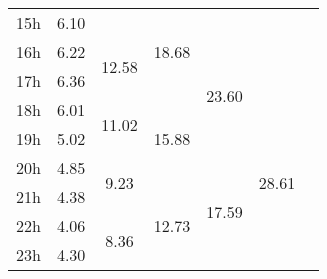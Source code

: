 \begin{center}
\begin{tabular}{| l || c | c | c | c | c | c |}
 15h  &  \multirow{1}{*}{ 6.10 }   &   &  \multirow{3}{*}{ 18.68 }   &   &   &  \\\cline{2-2}\cline{3-3}\cline{5-5} 
 16h  &  \multirow{1}{*}{ 6.22 }   &  \multirow{2}{*}{ 12.58 }   &   &  \multirow{4}{*}{ 23.60 }   &   &  \\\cline{2-2} 
 17h  &  \multirow{1}{*}{ 6.36 }   &   &   &   &   &  \\\cline{2-2}\cline{3-3}\cline{4-4}\cline{6-6} 
 18h  &  \multirow{1}{*}{ 6.01 }   &  \multirow{2}{*}{ 11.02 }   &  \multirow{3}{*}{ 15.88 }   &   &  \multirow{6}{*}{ 28.61 }   &  \\\cline{2-2} 
 19h  &  \multirow{1}{*}{ 5.02 }   &   &   &   &   &  \\\cline{2-2}\cline{3-3}\cline{5-5} 
 20h  &  \multirow{1}{*}{ 4.85 }   &  \multirow{2}{*}{ 9.23 }   &   &  \multirow{4}{*}{ 17.59 }   &   &  \\\cline{2-2}\cline{4-4} 
 21h  &  \multirow{1}{*}{ 4.38 }   &   &  \multirow{3}{*}{ 12.73 }   &   &   &  \\\cline{2-2}\cline{3-3} 
 22h  &  \multirow{1}{*}{ 4.06 }   &  \multirow{2}{*}{ 8.36 }   &   &   &   &  \\\cline{2-2} 
 23h & \multirow{1}{*}{ 4.30 }  & & & & & \\\cline{2-2}\cline{3-3}\cline{4-4}\cline{5-5}\cline{6-6}\cline{7-7} 
 \hline\end{tabular} 
 \end{center}